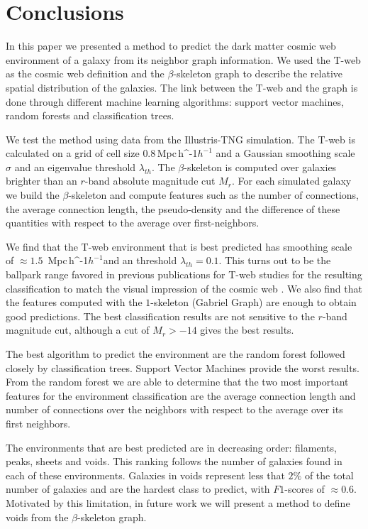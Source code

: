 \documentclass[usenatbib]{mnras}
\newcommand{\Mpch}{\,{\rm Mpc}\,\ifmmode h^{-1}\else $h^{-1}$\fi}
\begin{document}
\section{Conclusions}\label{sec:conclusions}

In this paper we presented a method to predict the dark matter cosmic web
environment of a galaxy from its neighbor graph information.
We used the T-web as the cosmic web definition \citep{Forero-Romero2009}
and the $\beta$-skeleton graph \citep{Fang2019} 
to describe the relative spatial distribution of the galaxies. 
The link between the T-web and the graph is done through different
machine learning algorithms: support vector machines, random forests and
classification trees.

We test the method using data from the Illustris-TNG simulation.
The T-web is calculated on a grid of cell size $0.8$\Mpch 
and a Gaussian smoothing scale $\sigma$ and an eigenvalue threshold $\lambda_{th}$.
The $\beta$-skeleton is computed over galaxies brighter than 
an $r$-band absolute magnitude cut $M_{r}$.
For each simulated galaxy we build the $\beta$-skeleton and
compute features such as the number of connections, the average connection
length, the pseudo-density and the difference of these quantities with
respect to the average over first-neighbors.

We find that the T-web environment that is best predicted has smoothing
scale of $\approx1.5$ \Mpch and an threshold $\lambda_{th}=0.1$. 
This turns out to be the ballpark range favored in previous publications
for T-web  studies for the resulting classification to match the visual impression of the cosmic web \citep{Forero-Romero2009}.
We also find that the features computed with the $1$-skeleton 
(Gabriel Graph) are enough to obtain good predictions. 
The best classification results are not sensitive to the $r$-band
magnitude cut, although a cut of $M_r>-14$ gives the best results.

The best algorithm to predict the environment are the random forest followed closely by classification trees. 
Support Vector Machines provide the worst results.
From the random forest we are able to determine that the two most
important features for the environment classification are the average connection length and number of connections over the neighbors with respect to the average over its first neighbors.

The environments that are best predicted are in decreasing order: 
filaments, peaks, sheets and voids. 
This ranking follows the number of galaxies found in each of these environments.
Galaxies in voids represent less that $2\%$ of the total number of galaxies and 
are the hardest class to predict, with $F1$-scores of $\approx0.6$.
Motivated by this limitation, in future work we will present a method to define
voids from the $\beta$-skeleton graph.
\end{document}
